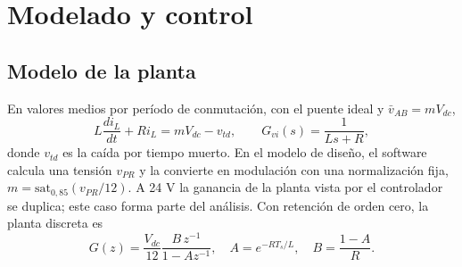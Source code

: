 \documentclass[conference]{IEEEtran}
\begin{document}
\section{Modelado y control}
\label{sec:control}
\subsection{Modelo de la planta}
En valores medios por período de conmutación, con el puente ideal y $\bar v_{AB}=mV_{dc}$,
\begin{equation}
L\frac{di_L}{dt}+Ri_L=mV_{dc}-v_{td},\qquad G_{vi}(s)=\frac{1}{Ls+R},
\end{equation}
donde $v_{td}$ es la caída por tiempo muerto. En el modelo de diseño, el software calcula una tensión $v_{PR}$ y la convierte en modulación con una normalización fija, $m=\mathrm{sat}_{0{,}85}(v_{PR}/12)$. A 24 V la ganancia de la planta vista por el controlador se duplica; este caso forma parte del análisis. Con retención de orden cero, la planta discreta es
\begin{equation}
G(z)=\frac{V_{dc}}{12}\frac{B\,z^{-1}}{1-Az^{-1}},\quad A=e^{-RT_s/L},\quad B=\frac{1-A}{R}.
\end{equation}
\end{document}
